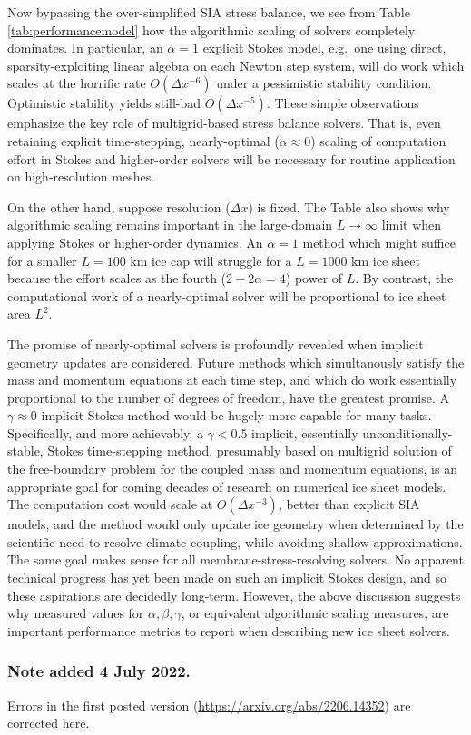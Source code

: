 \documentclass[twocolumn,letterpaper]{igs}
\begin{document}
Now bypassing the over-simplified SIA stress balance, we see from Table \ref{tab:performancemodel} how the algorithmic scaling of solvers completely dominates.  In particular, an $\alpha=1$ explicit Stokes model, e.g.~one using direct, sparsity-exploiting linear algebra on each Newton step system, will do work which scales at the horrific rate $O(\Delta x^{-6})$ under a pessimistic stability condition.  Optimistic stability yields still-bad $O(\Delta x^{-5})$.  These simple observations emphasize the key role of multigrid-based stress balance solvers.  That is, even retaining explicit time-stepping, nearly-optimal ($\alpha \approx 0$) scaling of computation effort in Stokes and higher-order solvers will be necessary for routine application on high-resolution meshes.

On the other hand, suppose resolution ($\Delta x$) is fixed.  The Table also shows why algorithmic scaling remains important in the large-domain $L\to\infty$ limit when applying Stokes or higher-order dynamics.  An $\alpha=1$ method which might suffice for a smaller $L=100$ km ice cap will struggle for a $L=1000$ km ice sheet because the effort scales as the fourth ($2+2\alpha=4$) power of $L$.  By contrast, the computational work of a nearly-optimal solver will be proportional to ice sheet area $L^2$.

The promise of nearly-optimal solvers is profoundly revealed when implicit geometry updates are considered.  Future methods which simultanously satisfy the mass and momentum equations at each time step, and which do work essentially proportional to the number of degrees of freedom, have the greatest promise.  A $\gamma \approx 0$ implicit Stokes method would be hugely more capable for many tasks.  Specifically, and more achievably, a $\gamma < 0.5$ implicit, essentially unconditionally-stable, Stokes time-stepping method, presumably based on multigrid solution of the free-boundary problem for the coupled mass and momentum equations, is an appropriate goal for coming decades of research on numerical ice sheet models.  The computation cost would scale at $O(\Delta x^{-3})$, better than explicit SIA models, and the method would only update ice geometry when determined by the scientific need to resolve climate coupling, while avoiding shallow approximations.  The same goal makes sense for all membrane-stress-resolving solvers.  No apparent technical progress has yet been made on such an implicit Stokes design, and so these aspirations are decidedly long-term.  However, the above discussion suggests why measured values for $\alpha,\beta,\gamma$, or equivalent algorithmic scaling measures, are important performance metrics to report when describing new ice sheet solvers.

\subsubsection{Note added 4 July 2022.}  Errors in the first posted version (\url{https://arxiv.org/abs/2206.14352}) are corrected here.



\end{document}
